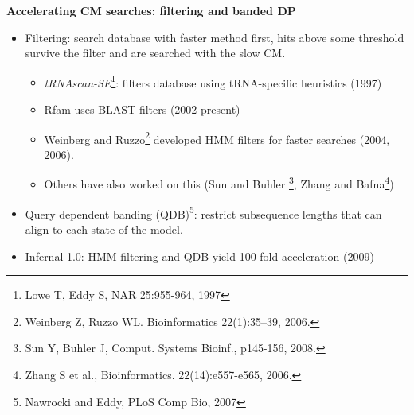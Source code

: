 \documentclass[landscape]{slides}
\begin{document}
\begin{slide}
\begin{center}
\textbf{Accelerating CM searches: filtering and banded DP}
\end{center}

\small
\begin{itemize}
\item
  Filtering: search database with faster method first, hits above some threshold \\ survive the filter and are searched with the slow CM.
  \begin{itemize}
  \item
    \emph{tRNAscan-SE}\footnote{Lowe T, Eddy S, NAR 25:955-964, 1997}:
    filters database using tRNA-specific heuristics (1997)
  \item
    Rfam uses BLAST filters (2002-present)
  \item
    Weinberg and Ruzzo\footnote{Weinberg Z, Ruzzo WL. Bioinformatics 22(1):35–39,
      2006.} developed HMM filters for faster searches (2004, 2006).
  \item
    Others have also worked on this (Sun and Buhler 
    \footnote{Sun Y, Buhler J, Comput. Systems
      Bioinf., p145-156, 2008.}, Zhang and Bafna\footnote{Zhang S et al.,
      Bioinformatics. 22(14):e557-e565, 2006.})
  \end{itemize}
\item
  Query dependent banding (QDB)\footnote{Nawrocki and Eddy, PLoS Comp
  Bio, 2007}: restrict subsequence lengths that can align to
  each state of the model.
\item Infernal 1.0: HMM filtering and QDB yield 100-fold acceleration (2009)
\end{itemize}

\vfill

\end{slide}
\end{document}
